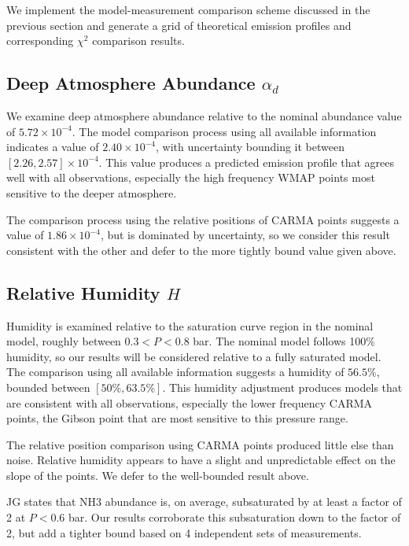 \documentclass{article}
\newcommand{\e}[1]{\times 10^{#1}}
\begin{document}
	We implement the model-measurement comparison scheme discussed in the previous section and generate a grid of theoretical emission profiles and corresponding $\chi^{2}$ comparison results.


\subsection{Deep Atmosphere Abundance $\alpha_{d}$}

	We examine deep atmosphere abundance relative to the nominal abundance value of $5.72\e{-4}$.
	The model comparison process using all available information indicates a value of $2.40\e{-4}$, with uncertainty bounding it between $[2.26, 2.57] \e{-4}$.
	This value produces a predicted emission profile that agrees well with all observations, especially the high frequency WMAP points most sensitive to the deeper atmosphere.

	The comparison process using the relative positions of CARMA points suggests a value of $1.86\e{-4}$, but is dominated by uncertainty, so we consider this result consistent with the other and defer to the more tightly bound value given above.

\subsection{Relative Humidity $H$}

	Humidity is examined relative to the saturation curve region in the nominal model, roughly between $0.3 < P < 0.8$ bar.
	The nominal model follows 100\% humidity, so our results will be considered relative to a fully saturated model.
	The comparison using all available information suggests a humidity of $56.5\%$, bounded between $[50\%, 63.5\%]$.
	This humidity adjustment produces models that are consistent with all observations, especially the lower frequency CARMA points, the Gibson point that are most sensitive to this pressure range.

	The relative position comparison using CARMA points produced little else than noise.
	Relative humidity appears to have a slight and unpredictable effect on the slope of the points.
	We defer to the well-bounded result above.

	JG states that NH3 abundance is, on average, subsaturated by at least a factor of 2 at $P < 0.6$ bar.
	Our results corroborate this subsaturation down to the factor of 2, but add a tighter bound based on 4 independent sets of measurements.
\end{document}
